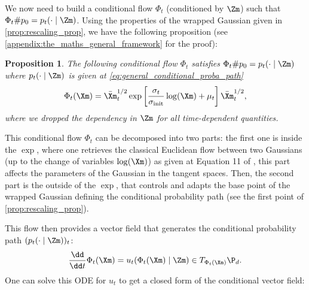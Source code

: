 \documentclass[10pt]{article} %
\theoremstyle{plain}
\newtheorem{proposition}[theorem]{Proposition}
\theoremstyle{definition}
\theoremstyle{remark}
\begin{document}
We now need to build a conditional flow $\Phi_t$ (conditioned by $\Zm$) such that $\Phi_t \# p_0 = p_t(\cdot \mid \Zm)$. Using the properties of the wrapped Gaussian given in \cref{prop:rescaling_prop}, we have the following proposition (see \cref{appendix:the_maths_general_framework} for the proof):
\begin{proposition}
  The following conditional flow $\Phi_t$ satisfies $\Phi_t \# p_0 = p_t(\cdot \mid \Zm)$ where $p_t(\cdot \mid \Zm)$ is given at \cref{eq:general_conditional_proba_path}
  \begin{equation}\label{eq:general_flow}
    \Phi_t(\Xm) =
    \bar{\Xm}_t^{1/2}\exp\left[\frac{\sigma_t}{\sigma_{\text{init}}}\log(\Xm) + \mu_t\right]\bar{\Xm}_t^{1/2},
  \end{equation}
  where we dropped the dependency in $\Zm$ for all time-dependent quantities.
\end{proposition}
This conditional flow $\Phi_t$ can be decomposed into two parts: the first one is inside the $\exp$, where one retrieves the classical Euclidean flow between two Gaussians (up to the change of variables $\log(\Xm)$) as given at Equation 11 of \citet{lipmanFlowMatchingGenerative2023}, this part affects the parameters of the Gaussian in the tangent spaces. Then, the second part is the outside of the $\exp$, that controls and adapts the base point of the wrapped Gaussian defining the conditional probability path (see the first point of \cref{prop:rescaling_prop}).

This flow then provides a vector field that generates the conditional probability path $(p_t(\cdot \mid \Zm))_t$:
$$\frac{\dd}{\dd t} \Phi_t(\Xm) = u_t(\Phi_t(\Xm) \mid \Zm) \in T_{\Phi_t(\Xm)} \P_d.$$
One can solve this ODE for $u_t$ to get a closed form of the conditional vector field:
\end{document}
